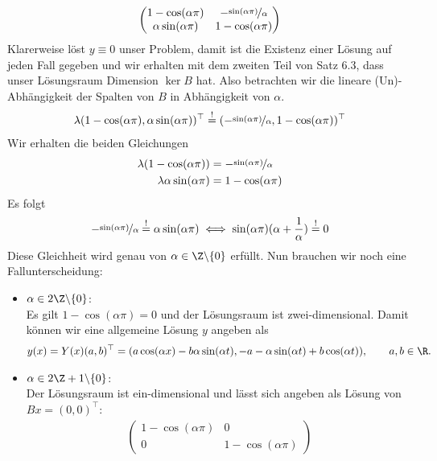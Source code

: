 \begin{solution}
\begin{enumerate}[label = \textbf{\alph*)}]
\begin{align*}
\begin{pmatrix}
      1 - \cos(\alpha \pi) & -\nicefrac{\sin(\alpha \pi)}{\alpha} \\
      \alpha\sin(\alpha \pi) & 1 - \cos(\alpha \pi)
    \end{pmatrix}
  \end{align*}
  Klarerweise löst $y \equiv 0$ unser Problem, damit ist die Existenz einer Lösung
  auf jeden Fall gegeben und wir erhalten mit dem zweiten Teil von Satz 6.3, dass
  unser Lösungsraum Dimension $\ker B$ hat. Also betrachten wir die lineare
  (Un)-Abhängigkeit der Spalten von $B$ in Abhängigkeit von $\alpha$.
  \begin{align*}
    \lambda(1 - \cos(\alpha \pi), \alpha\sin(\alpha \pi))^{\top} \stackrel{!}{=}
    (-\nicefrac{\sin(\alpha \pi)}{\alpha},1 - \cos(\alpha \pi))^{\top}
  \end{align*}
  Wir erhalten die beiden Gleichungen
  \begin{align*}
    \lambda(1 - \cos(\alpha \pi)) &= -\nicefrac{\sin(\alpha \pi)}{\alpha} \\
    \lambda\alpha\sin(\alpha \pi) &= 1 - \cos(\alpha \pi)
  \end{align*}
  Es folgt
  \begin{align*}
     -\nicefrac{\sin(\alpha \pi)}{\alpha} \stackrel{!}{=} \alpha\sin(\alpha \pi)
     \iff \sin(\alpha \pi)(\alpha + \frac{1}{\alpha}) \stackrel{!}{=} 0
  \end{align*}
  Diese Gleichheit wird genau von $\alpha \in \Z\backslash\{0\}$ erfüllt. Nun brauchen
  wir noch eine Fallunterscheidung:
  \begin{itemize}
    \item $\alpha \in 2\Z\backslash\{0\}$: \\
    Es gilt $1 - \cos(\alpha \pi) = 0$ und der Lösungsraum ist zwei-dimensional. Damit können wir eine allgemeine Lösung $y$
    angeben als
    \begin{align*}
      y(x) = Y(x)(a,b)^{\top} = (a\cos(\alpha x) - b\alpha\sin(\alpha t), -a-\alpha\sin(\alpha t) + b\cos(\alpha t)), \qquad a,b \in \R.
    \end{align*}
    \item $\alpha \in 2\Z+1\backslash\{0\}$: \\
      Der Lösungsraum ist ein-dimensional und lässt sich angeben als
      Lösung von $Bx = (0,0)^{\top}$:
      \begin{align*}
        \begin{pmatrix}
          1 - \cos(\alpha \pi) & 0 \\
          0 & 1 - \cos(\alpha \pi)

\end{pmatrix}
\end{align*}
\end{itemize}
\end{enumerate}
\end{solution}
